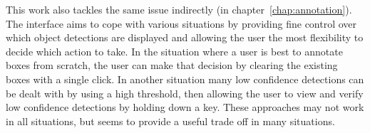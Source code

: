 This work also tackles the same issue indirectly (in chapter~\ref{chap:annotation}). The interface aims to cope with various situations by providing fine control over which object detections are displayed and allowing the user the most flexibility to decide which action to take. In the situation where a user is best to annotate boxes from scratch, the user can make that decision by clearing the existing boxes with a single click. In another situation many low confidence detections can be dealt with by using a high threshold, then allowing the user to view and verify low confidence detections by holding down a key. These approaches may not work in all situations, but seems to provide a useful trade off in many situations.









